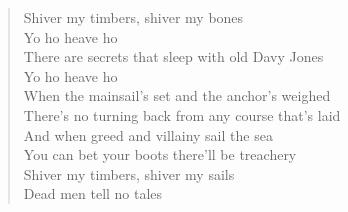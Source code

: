 \documentclass[11pt]{article}
\begin{document}
\begin{verse}
\vspace*{1em}
Shiver my timbers, shiver my bones\\
Yo ho heave ho\\
There are secrets that sleep with old Davy Jones\\
Yo ho heave ho\\
\vspace*{1em}
When the mainsail's set and the anchor's weighed\\
There's no turning back from any course that's laid\\
And when greed and villainy sail the sea\\
You can bet your boots there'll be treachery\\
Shiver my timbers, shiver my sails\\
Dead men tell no tales\\
\end{verse}
\clearpage
\end{document}
